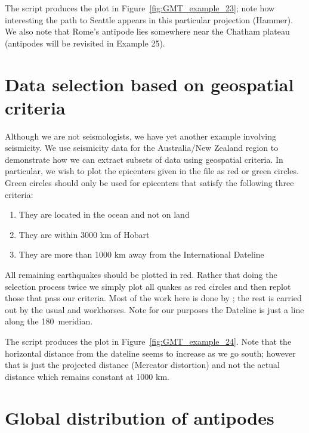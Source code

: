 
The script produces the plot in Figure~\ref{fig:GMT_example_23}; note how
interesting the path to Seattle appears in this particular projection (Hammer).
We also note that Rome's antipode lies somewhere near the Chatham plateau (antipodes
will be revisited in Example 25).


\section{Data selection based on geospatial criteria}

Although we are not seismologists, we have yet another example involving seismicity.
We use seismicity data for the Australia/New Zealand region to demonstrate how we can
extract subsets of data using geospatial criteria.  In particular, we wish to plot
the epicenters given in the file  as red or green circles.
Green circles should only be used for epicenters that satisfy the following three criteria:
\begin{enumerate}
\item They are located in the ocean and not on land
\item They are within 3000 km of Hobart
\item They are more than 1000 km away from the International Dateline
\end{enumerate}
All remaining earthquakes should be plotted in red.  Rather that doing the selection
process twice we simply plot all quakes as red circles and then replot those that
pass our criteria.  Most of the work here is done by ; the rest
is carried out by the usual  and  workhorses.  Note
for our purposes the Dateline is just a line along the 180\DS\ meridian.


The script produces the plot in Figure~\ref{fig:GMT_example_24}.  Note that the
horizontal distance from the dateline seems to increase as we go south; however that
is just the projected distance (Mercator distortion) and not the actual distance
which remains constant at 1000 km.


\section{Global distribution of antipodes}

